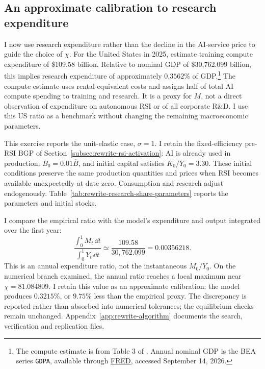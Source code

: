 \subsection{An approximate calibration to research expenditure}
\label{subsec:rewrite-rsi-research-share}

I now use research expenditure rather than the decline in the AI-service
price to guide the choice of $\chi$. For the United States in 2025,
\citet{korinekmckelvey2026} estimate training compute expenditure of
\$109.58 billion. Relative to nominal GDP of \$30,762.099 billion, this
implies research expenditure of approximately $0.3562\%$ of GDP.\footnote{The
compute estimate is from Table 3 of \citet{korinekmckelvey2026}. Annual
nominal GDP is the BEA series \texttt{GDPA}, available through
\href{https://fred.stlouisfed.org/data/GDPA}{FRED}, accessed September 14, 2026.}
The compute estimate uses rental-equivalent costs and assigns half of total
AI compute spending to training and research. It is a proxy for $M$, not a
direct observation of expenditure on autonomous RSI or of all corporate
R\&D. I use this US ratio as a benchmark without changing the remaining
macroeconomic parameters.

This exercise reports the unit-elastic case, $\sigma=1$. I retain the
fixed-efficiency pre-RSI BGP of Section~\ref{subsec:rewrite-rsi-activation}:
AI is already used in production, $B_0=0.01\overline B$, and initial
capital satisfies $K_0/Y_0=3.30$. These initial conditions preserve the
same production quantities and prices when RSI becomes available
unexpectedly at date zero. Consumption and research adjust endogenously.
Table~\ref{tab:rewrite-research-share-parameters} reports the parameters
and initial stocks.



I compare the empirical ratio with the model's expenditure and output
integrated over the first year:
\begin{equation}
 \frac{\int_0^1 M_t\,\dd t}{\int_0^1 Y_t\,\dd t}
 \simeq \frac{109.58}{30{,}762.099}=0.00356218.
 \label{eq:rewrite-research-share-target}
\end{equation}
This is an annual expenditure ratio, not the instantaneous $M_0/Y_0$.
On the numerical branch examined, the annual ratio reaches a local maximum
near $\chi=81.084809$. I retain this value as an approximate calibration:
the model produces $0.3215\%$, or $9.75\%$ less than the empirical proxy.
The discrepancy is reported rather than absorbed into numerical tolerances;
the equilibrium checks remain unchanged. Appendix~\ref{app:rewrite-algorithm}
documents the search, verification and replication files.

